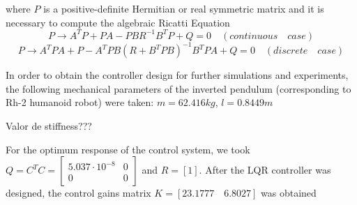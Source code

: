 where $P$ is a positive-definite Hermitian or real symmetric matrix and it is necessary to compute the algebraic Ricatti Equation
\begin{equation}
P \rightarrow A^{T}P+PA-PBR^{-1}B^{T}P+Q = 0 \quad (continuous \quad case)
\end{equation}
\begin{equation}
P \rightarrow A^{T}PA+P-A^{T}PB(R+B^{T}PB)^{-1}B^{T}PA+Q = 0 \quad (discrete \quad case)
\end{equation}


In order to obtain the controller design for further simulations and experiments, the following mechanical parameters of the inverted pendulum (corresponding to Rh-2 humanoid robot) were taken: $m = 62.416 kg$, $l=0.8449 m$

Valor de stiffness???

For the optimum response of the control system, we took $Q = C^{T}C = \begin{bmatrix}
5.037 \cdot 10^{-8} & 0\\
0 & 0
\end{bmatrix}$ and $R = [1] $. After the LQR controller was designed, the control gains matrix $K = [23.1777 \quad 6.8027]$ was obtained









